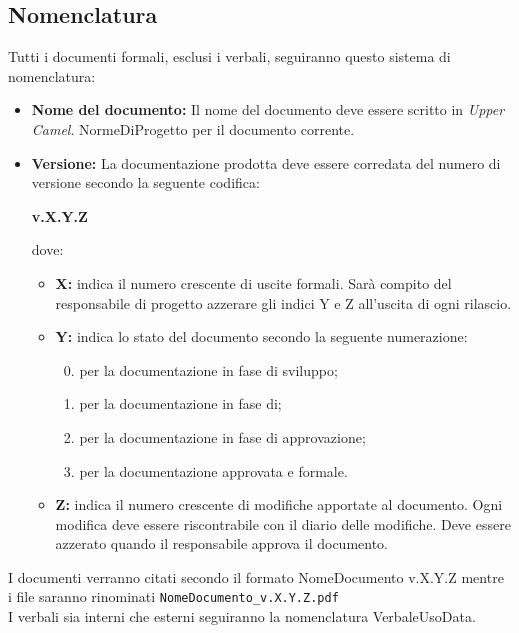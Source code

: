 \subsection{Nomenclatura}
Tutti i documenti formali, esclusi i verbali, seguiranno questo sistema di nomenclatura:
\begin{itemize}
	\item \textbf{Nome del documento:} Il nome del documento deve essere scritto in \textit{Upper Camel}.
	NormeDiProgetto per il documento corrente. 
	\item \textbf{Versione:} La documentazione prodotta deve essere corredata del numero di versione secondo la seguente codifica:
	
	\textbf{v.X.Y.Z}
	
	dove:
	\begin{itemize}
		\item \textbf{X:} indica il numero crescente di uscite formali. Sarà compito del responsabile di progetto azzerare gli indici Y e Z all'uscita di ogni rilascio.
		\item \textbf{Y:} indica lo stato del documento secondo la seguente numerazione:
		\begin{enumerate}
			\setcounter{enumi}{-1}
			\item per la documentazione in fase di sviluppo;
			\item per la documentazione in fase di;
			\item per la documentazione in fase di approvazione;
			\item per la documentazione approvata e formale.
		\end{enumerate}
		\item \textbf{Z:} indica il numero crescente di modifiche apportate al documento. Ogni modifica deve essere riscontrabile con il diario delle modifiche. Deve essere azzerato quando il responsabile approva il documento. 	
	\end{itemize}
\end{itemize}

I documenti verranno citati secondo il formato NomeDocumento v.X.Y.Z mentre i file saranno rinominati \texttt{NomeDocumento\_v.X.Y.Z.pdf} \\
I verbali sia interni che esterni seguiranno la nomenclatura VerbaleUsoData.


